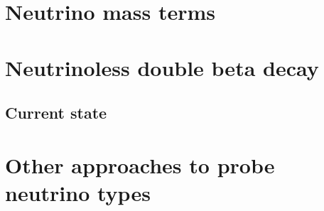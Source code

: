 \section{Neutrino mass terms}
\label{sec:mass}

\section{Neutrinoless double beta decay}
\label{sec:0n2b}

\subsection{Current state}
\label{sec:state}

\section{Other approaches to probe neutrino types}
\label{sec:others}



